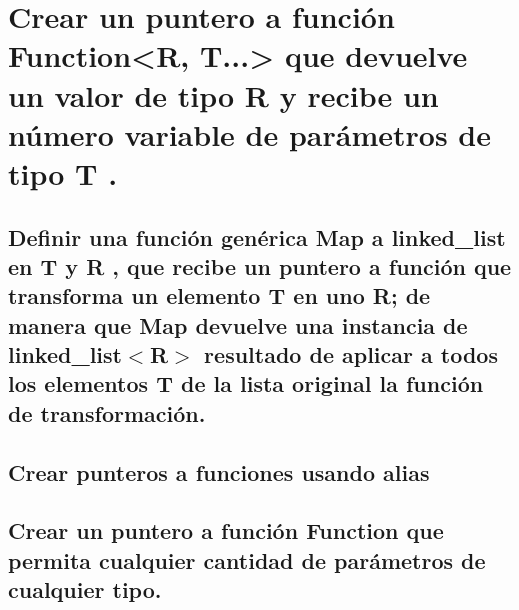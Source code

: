 \documentclass[10pt]{article}
\begin{document}
\newpage
\section{Crear un puntero a función Function<R, T...> que devuelve un valor de tipo R y recibe un número variable de parámetros de tipo T .}

\subsection{Definir una función genérica Map a linked\_list en T y R , que recibe un puntero a función que transforma un elemento T en uno R; de manera que Map devuelve una instancia de linked\_list$ < $R$ > $ resultado de aplicar a todos los elementos T de la lista original la función de transformación.}

\subsection{Crear punteros a funciones usando alias }

\subsection{Crear un puntero a función Function que permita cualquier cantidad de parámetros de cualquier tipo.}
\end{document}
